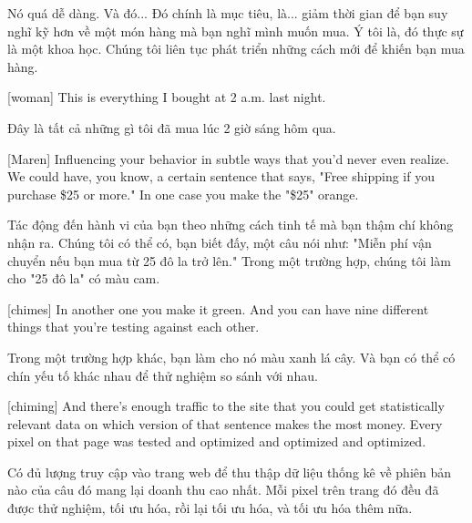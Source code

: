 \documentclass[a4paper]{article}
\begin{document}
	
	\begin{vietnamese-v2}
		Nó quá dễ dàng. Và đó... Đó chính là mục tiêu, là... giảm thời gian để bạn suy nghĩ kỹ hơn về một món hàng mà bạn nghĩ mình muốn mua. 
		Ý tôi là, đó thực sự là một khoa học. 
		Chúng tôi liên tục phát triển những cách mới để khiến bạn mua hàng.
	\end{vietnamese-v2}
	
	[woman] This is everything I bought at 2 a.m. last night.
	
	\begin{vietnamese-v2}
		 Đây là tất cả những gì tôi đã mua lúc 2 giờ sáng hôm qua.
	\end{vietnamese-v2}
	
	[Maren] Influencing your behavior in subtle ways that you'd never even realize. We could have, you know, a certain sentence that says, "Free shipping if you purchase \$25 or more." In one case you make the "\$25" orange.

	\begin{vietnamese-v2}
		[Maren] Tác động đến hành vi của bạn theo những cách tinh tế mà bạn thậm chí không nhận ra. Chúng tôi có thể có, bạn biết đấy, một câu nói như: "Miễn phí vận chuyển nếu bạn mua từ 25 đô la trở lên." Trong một trường hợp, chúng tôi làm cho "25 đô la" có màu cam.
	\end{vietnamese-v2}

	[chimes]
	In another one you make it green. And you can have nine different things that you're testing against each other.
	
	\begin{vietnamese-v2}
		Trong một trường hợp khác, bạn làm cho nó màu xanh lá cây. Và bạn có thể có chín yếu tố khác nhau để thử nghiệm so sánh với nhau.
	\end{vietnamese-v2}
	
	[chiming]
	And there's enough traffic to the site that you could get statistically relevant data on which version of that sentence makes the most money.
	Every pixel on that page was tested and optimized and optimized and optimized.
	
	\begin{vietnamese-v2}
		Có đủ lượng truy cập vào trang web để thu thập dữ liệu thống kê về phiên bản nào của câu đó mang lại doanh thu cao nhất. Mỗi pixel trên trang đó đều đã được thử nghiệm, tối ưu hóa, rồi lại tối ưu hóa, và tối ưu hóa thêm nữa.
	\end{vietnamese-v2}
	
\end{document}
